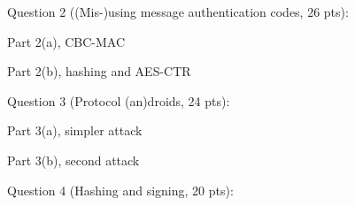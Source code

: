 \documentclass[11pt]{article}
\begin{document}
\newpage

Question 2 ((Mis-)using message authentication codes, 26 pts):

Part 2(a), CBC-MAC

\vspace{3in}

Part 2(b), hashing and AES-CTR

\newpage

Question 3 (Protocol (an)droids, 24 pts):

Part 3(a), simpler attack

\vspace{3in}

Part 3(b), second attack

\newpage

Question 4 (Hashing and signing, 20 pts):
\end{document}
